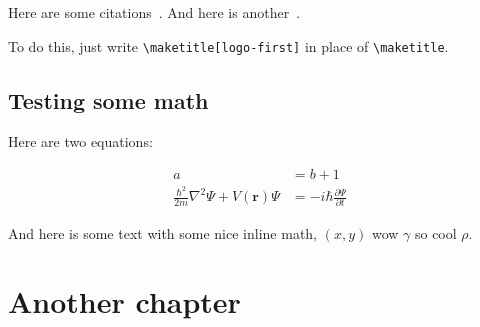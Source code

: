 \documentclass[harvard]{lincolncsthesis}
\begin{document}
Here are some citations~\citep{williams2017time}. And here is another~\cite{williams2016modular}.

To do this, just write \texttt{\textbackslash maketitle[logo-first]} in place of \texttt{\textbackslash maketitle}.

\section{Testing some math}
Here are two equations:


    
\begin{align}
a &= b + 1 \\
\frac{\hbar^2}{2m}\nabla^2\Psi + V(\mathbf{r})\Psi
&= -i\hbar \frac{\partial\Psi}{\partial t}    
\end{align}


And here is some text with some nice inline math, $(x, y)$ wow $\gamma$ so cool $\rho$.


\chapter{Another chapter}
\blindtext[10]

\printReferences

\end{document}
